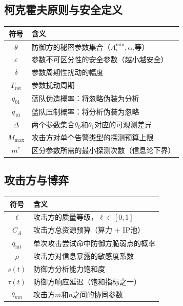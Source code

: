 \documentclass[11pt,a4paper]{article}
\begin{document}
\subsection{柯克霍夫原则与安全定义}

\begin{center}
\begin{xltabular}{\textwidth}{c|X}
\toprule
\textbf{符号} & \textbf{含义} \\
\midrule
$\theta$ & 防御方的秘密参数集合（$A_i^{\min}, \alpha_i$等） \\
$\varepsilon$ & 参数不可区分性的安全参数（越小越安全） \\
$\delta$ & 参数周期性扰动的幅度 \\
$T_{\text{rot}}$ & 参数扰动周期 \\
$q_{01}$ & 蓝队伪造概率：将忽略伪装为分析 \\
$q_{10}$ & 蓝队压制概率：将分析伪装为忽略 \\
$\Delta$ & 两个参数集合$\theta_0$和$\theta_1$对应的可观测差异 \\
$M_{\max}$ & 攻击方对单个告警类型的探测预算上限 \\
$m^*$ & 区分参数所需的最小探测次数（信息论下界） \\
\bottomrule
\end{xltabular}
\end{center}

\subsection{攻击方与博弈}

\begin{center}
\begin{xltabular}{\textwidth}{c|X}
\toprule
\textbf{符号} & \textbf{含义} \\
\midrule
$\ell$ & 攻击方的质量等级，$\ell \in [0,1]$ \\
$C_A$ & 攻击方总资源预算（算力 + IP池） \\
$q_{\text{hit}}$ & 单次攻击尝试命中防御方脆弱点的概率 \\
$\rho$ & 攻击方对信息暴露的敏感度系数 \\
$s(t)$ & 防御方分析能力饱和度 \\
$\tau(t)$ & 防御方响应延迟（饱和指标之一） \\
$\theta_{mn}$ & 攻击方$m$和$n$之间的协同参数 \\
\bottomrule
\end{xltabular}
\end{center}
\end{document}
